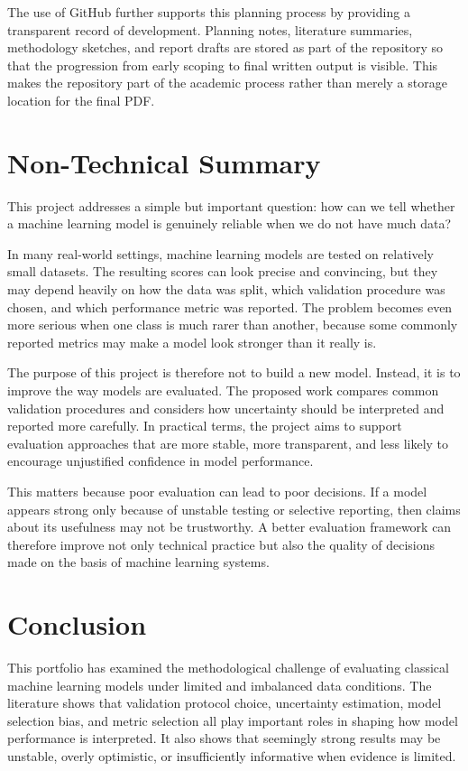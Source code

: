 \documentclass[11pt,a4paper]{article}
\begin{document}
The use of GitHub further supports this planning process by providing a transparent record of development. Planning notes, literature summaries, methodology sketches, and report drafts are stored as part of the repository so that the progression from early scoping to final written output is visible. This makes the repository part of the academic process rather than merely a storage location for the final PDF.

\section{Non-Technical Summary}

This project addresses a simple but important question: how can we tell whether a machine learning model is genuinely reliable when we do not have much data?

In many real-world settings, machine learning models are tested on relatively small datasets. The resulting scores can look precise and convincing, but they may depend heavily on how the data was split, which validation procedure was chosen, and which performance metric was reported. The problem becomes even more serious when one class is much rarer than another, because some commonly reported metrics may make a model look stronger than it really is.

The purpose of this project is therefore not to build a new model. Instead, it is to improve the way models are evaluated. The proposed work compares common validation procedures and considers how uncertainty should be interpreted and reported more carefully. In practical terms, the project aims to support evaluation approaches that are more stable, more transparent, and less likely to encourage unjustified confidence in model performance.

This matters because poor evaluation can lead to poor decisions. If a model appears strong only because of unstable testing or selective reporting, then claims about its usefulness may not be trustworthy. A better evaluation framework can therefore improve not only technical practice but also the quality of decisions made on the basis of machine learning systems.

\section{Conclusion}

This portfolio has examined the methodological challenge of evaluating classical machine learning models under limited and imbalanced data conditions. The literature shows that validation protocol choice, uncertainty estimation, model selection bias, and metric selection all play important roles in shaping how model performance is interpreted. It also shows that seemingly strong results may be unstable, overly optimistic, or insufficiently informative when evidence is limited.
\end{document}
